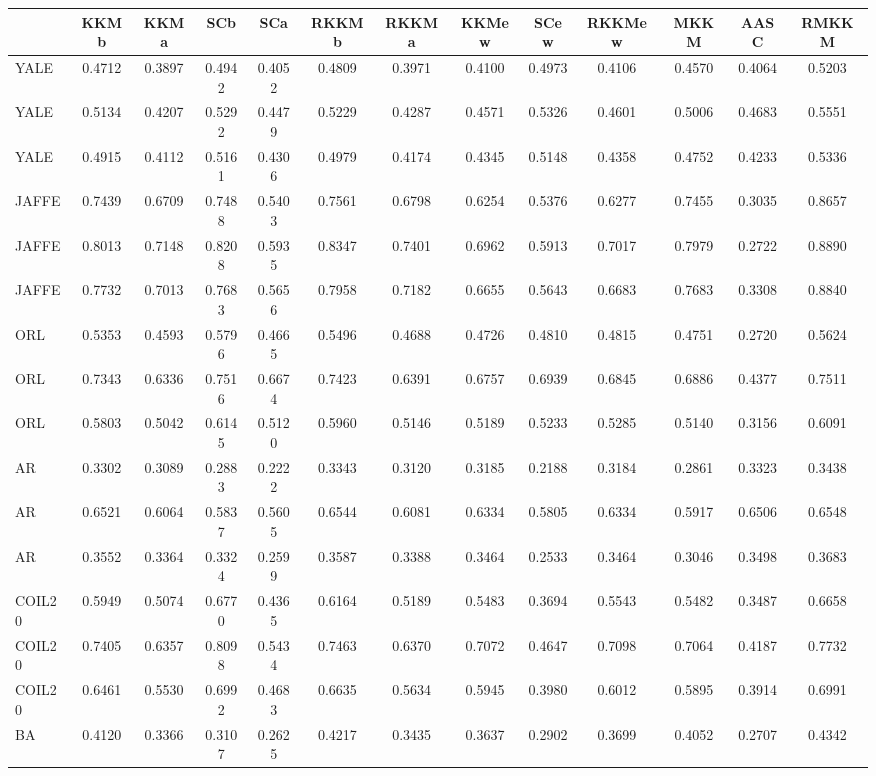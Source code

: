 \begin{tiny}\begin{tabular}{|l|c|c|c|c|c|c|c|c|c|c|c|c|}
\hline
&\textrm{KKMb}&\textrm{KKMa}&\textrm{SCb}&\textrm{SCa}&\textrm{RKKMb}&\textrm{RKKMa}&\textrm{KKMew}&\textrm{SCew}&\textrm{RKKMew}&\textrm{MKKM}&\textrm{AASC}&\textrm{RMKKM}\\\hline
\textrm{YALE}&0.4712&0.3897&0.4942&0.4052&0.4809&0.3971&0.4100&0.4973&0.4106&0.4570&0.4064&0.5203\\\hline
\textrm{YALE}&0.5134&0.4207&0.5292&0.4479&0.5229&0.4287&0.4571&0.5326&0.4601&0.5006&0.4683&0.5551\\\hline
\textrm{YALE}&0.4915&0.4112&0.5161&0.4306&0.4979&0.4174&0.4345&0.5148&0.4358&0.4752&0.4233&0.5336\\\hline
\textrm{JAFFE}&0.7439&0.6709&0.7488&0.5403&0.7561&0.6798&0.6254&0.5376&0.6277&0.7455&0.3035&0.8657\\\hline
\textrm{JAFFE}&0.8013&0.7148&0.8208&0.5935&0.8347&0.7401&0.6962&0.5913&0.7017&0.7979&0.2722&0.8890\\\hline
\textrm{JAFFE}&0.7732&0.7013&0.7683&0.5656&0.7958&0.7182&0.6655&0.5643&0.6683&0.7683&0.3308&0.8840\\\hline
\textrm{ORL}&0.5353&0.4593&0.5796&0.4665&0.5496&0.4688&0.4726&0.4810&0.4815&0.4751&0.2720&0.5624\\\hline
\textrm{ORL}&0.7343&0.6336&0.7516&0.6674&0.7423&0.6391&0.6757&0.6939&0.6845&0.6886&0.4377&0.7511\\\hline
\textrm{ORL}&0.5803&0.5042&0.6145&0.5120&0.5960&0.5146&0.5189&0.5233&0.5285&0.5140&0.3156&0.6091\\\hline
\textrm{AR}&0.3302&0.3089&0.2883&0.2222&0.3343&0.3120&0.3185&0.2188&0.3184&0.2861&0.3323&0.3438\\\hline
\textrm{AR}&0.6521&0.6064&0.5837&0.5605&0.6544&0.6081&0.6334&0.5805&0.6334&0.5917&0.6506&0.6548\\\hline
\textrm{AR}&0.3552&0.3364&0.3324&0.2599&0.3587&0.3388&0.3464&0.2533&0.3464&0.3046&0.3498&0.3683\\\hline
\textrm{COIL20}&0.5949&0.5074&0.6770&0.4365&0.6164&0.5189&0.5483&0.3694&0.5543&0.5482&0.3487&0.6658\\\hline
\textrm{COIL20}&0.7405&0.6357&0.8098&0.5434&0.7463&0.6370&0.7072&0.4647&0.7098&0.7064&0.4187&0.7732\\\hline
\textrm{COIL20}&0.6461&0.5530&0.6992&0.4683&0.6635&0.5634&0.5945&0.3980&0.6012&0.5895&0.3914&0.6991\\\hline
\textrm{BA}&0.4120&0.3366&0.3107&0.2625&0.4217&0.3435&0.3637&0.2902&0.3699&0.4052&0.2707&0.4342\\\hline

\end{tabular}
\end{tiny}
